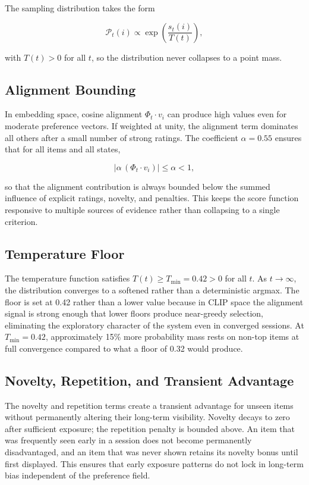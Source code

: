 \documentclass[12pt, a4paper]{article}
\theoremstyle{definition}
\begin{document}
The sampling distribution takes the form

\begin{equation}
\mathcal{P}_t(i) \propto \exp\!\left(\frac{s_t(i)}{T(t)}\right),
\end{equation}

with $T(t) > 0$ for all $t$, so the distribution never collapses to a point mass.

\subsection{Alignment Bounding}

In embedding space, cosine alignment $\Phi_t \cdot v_i$ can produce high values even for moderate preference vectors. If weighted at unity, the alignment term dominates all others after a small number of strong ratings. The coefficient $\alpha = 0.55$ ensures that for all items and all states,

\begin{equation}
|\alpha\,(\Phi_t \cdot v_i)| \le \alpha < 1,
\end{equation}

so that the alignment contribution is always bounded below the summed influence of explicit ratings, novelty, and penalties. This keeps the score function responsive to multiple sources of evidence rather than collapsing to a single criterion.

\subsection{Temperature Floor}

The temperature function satisfies $T(t) \ge T_{\min} = 0.42 > 0$ for all $t$. As $t \to \infty$, the distribution converges to a softened rather than a deterministic argmax. The floor is set at 0.42 rather than a lower value because in CLIP space the alignment signal is strong enough that lower floors produce near-greedy selection, eliminating the exploratory character of the system even in converged sessions. At $T_{\min} = 0.42$, approximately 15\% more probability mass rests on non-top items at full convergence compared to what a floor of 0.32 would produce.

\subsection{Novelty, Repetition, and Transient Advantage}

The novelty and repetition terms create a transient advantage for unseen items without permanently altering their long-term visibility. Novelty decays to zero after sufficient exposure; the repetition penalty is bounded above. An item that was frequently seen early in a session does not become permanently disadvantaged, and an item that was never shown retains its novelty bonus until first displayed. This ensures that early exposure patterns do not lock in long-term bias independent of the preference field.
\end{document}
